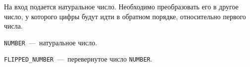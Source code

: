 На вход подается натуральное число. Необходимо преобразовать его в другое число, у которого цифры будут идти в обратном порядке, относительно первого числа.

\InputFile

\texttt{NUMBER}~---~натуральное число.

\OutputFile

\texttt{FLIPPED\_NUMBER}~---~перевернутое число \texttt{NUMBER}.

\SAMPLES